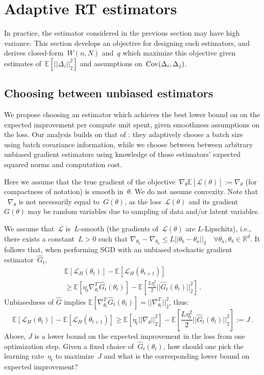 
\section{Adaptive RT estimators}
In practice, the estimator considered in the previous section may have high variance.
This section develops an objective for designing such estimators, and derives closed-form~$W(n, N)$ and~$q$ which maximize this objective given estimates of~$\mathbb{E}[||\Delta_i||_2^2]$ and assumptions on~$\mathrm{Cov}(\Delta_i, \Delta_j)$.

\subsection{Choosing between unbiased estimators}
We propose choosing an estimator which achieves the best lower bound on on the expected improvement per compute unit spent, given smoothness assumptions on the loss.
Our analysis builds on that of \citet{balles2016coupling}: they adaptively choose a batch size using batch covariance information, while we choose between between arbitrary unbiased gradient estimators using knowledge of those estimators' expected squared norms and computation cost.

Here we assume that the true gradient of the objective~$\nabla_\theta \mathbb{E}[ \mathcal{L}(\theta)] := \nabla_\theta$ (for compactness of notation) is smooth in~$\theta$.
We do not assume convexity.
Note that ~$\nabla_\theta$ is not necessarily equal to~$G(\theta)$, as the loss~$\mathcal{L}(\theta)$ and its gradient~$G(\theta)$ may be random variables due to sampling of data and/or latent variables.

We assume that~$\mathcal{L}$ is~$L$-smooth (the gradients of~$\mathcal{L}(\theta)$ are $L$-Lipschitz), i.e., there exists a constant~${L > 0}$ such that ${\nabla_{\theta_b}\! -\! \nabla_{\theta_a}\! \leq\! L || \theta_b\! -\! \theta_a||_2 \quad \forall \theta_a, \theta_b \in \mathbb{R}^d}$.
It follows \citep{balles2016coupling, bottou2018optimization} that, when performing SGD with an unbiased stochastic gradient estimator~$\hat{G}_t$,
\begin{multline}
\mathbb{E}[\mathcal{L}_H(\theta_t)] - \mathbb{E}[\mathcal{L}_H (\theta_{t+1})] \\ \geq
\mathbb{E}[\eta_t \nabla_{\theta_t}^T \hat{G}_t(\theta_{t})] - \mathbb{E}[\frac{L\eta_t^2}{2} ||\hat{G}_t(\theta_{t})||_2^2]\,.
\end{multline}
Unbiasedness of $\hat{G}$ implies
$\mathbb{E}[\nabla_{\theta_t}^T \hat{G}_t(\theta_t)] = ||\nabla_{\theta_t}^T||_2^2$,
thus:
\[
\mathbb{E}[\mathcal{L}_H(\theta_t)] - \mathbb{E}[\mathcal{L}_H (\theta_{t+1})] \geq
\mathbb{E}[\eta_t ||\nabla_\theta||_2^2] - \mathbb{E}[\frac{L\eta_t^2}{2} ||\hat{G}_t(\theta_{t})||_2^2]
:= J\,.
\]
Above, $J$ is a lower bound on the expected improvement in the loss from one optimization step.
Given a fixed choice of~$\hat{G}_t(\theta_t)$, how should one pick the learning rate~$\eta_t$ to maximize~$J$ and what is the corresponding lower bound on expected improvement?

